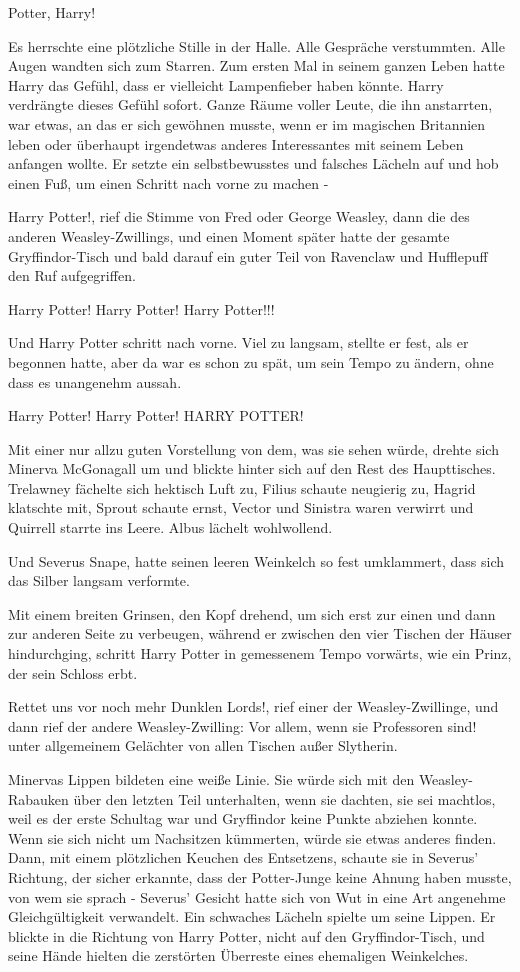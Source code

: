 \glqq Potter, Harry!\grqq{}

Es herrschte eine plötzliche Stille in der Halle. Alle Gespräche verstummten.
Alle Augen wandten sich zum Starren. Zum ersten Mal in seinem ganzen Leben hatte
Harry das Gefühl, dass er vielleicht Lampenfieber haben könnte. Harry verdrängte
dieses Gefühl sofort. Ganze Räume voller Leute, die ihn anstarrten, war etwas,
an das er sich gewöhnen musste, wenn er im magischen Britannien leben oder
überhaupt irgendetwas anderes Interessantes mit seinem Leben anfangen wollte. Er
setzte ein selbstbewusstes und falsches Lächeln auf und hob einen Fuß, um einen
Schritt nach vorne zu machen -

\glqq Harry Potter!\grqq{}, rief die Stimme von Fred oder George Weasley, dann
die des anderen Weasley-Zwillings, und einen Moment später hatte der gesamte
Gryffindor-Tisch und bald darauf ein guter Teil von Ravenclaw und Hufflepuff den
Ruf aufgegriffen.

\glqq Harry Potter! Harry Potter! Harry Potter!!!\grqq{}

Und Harry Potter schritt nach vorne. Viel zu langsam, stellte er fest, als er
begonnen hatte, aber da war es schon zu spät, um sein Tempo zu ändern, ohne dass
es unangenehm aussah.

\glqq Harry Potter! Harry Potter! HARRY POTTER!\grqq{}

Mit einer nur allzu guten Vorstellung von dem, was sie sehen würde, drehte sich
Minerva McGonagall um und blickte hinter sich auf den Rest des Haupttisches.
Trelawney fächelte sich hektisch Luft zu, Filius schaute neugierig zu, Hagrid
klatschte mit, Sprout schaute ernst, Vector und Sinistra waren verwirrt und
Quirrell starrte ins Leere. Albus lächelt wohlwollend.

Und Severus Snape, hatte seinen leeren Weinkelch so fest umklammert, dass sich
das Silber langsam verformte.

Mit einem breiten Grinsen, den Kopf drehend, um sich erst zur einen und dann zur
anderen Seite zu verbeugen, während er zwischen den vier Tischen der Häuser
hindurchging, schritt Harry Potter in gemessenem Tempo vorwärts, wie ein Prinz,
der sein Schloss erbt.

\glqq Rettet uns vor noch mehr Dunklen Lords!\grqq{}, rief einer der
Weasley-Zwillinge, und dann rief der andere Weasley-Zwilling: \glqq Vor allem,
wenn sie Professoren sind!\grqq{} unter allgemeinem Gelächter von allen Tischen
außer Slytherin.

Minervas Lippen bildeten eine weiße Linie. Sie würde sich mit den
Weasley-Rabauken über den letzten Teil unterhalten, wenn sie dachten, sie sei
machtlos, weil es der erste Schultag war und Gryffindor keine Punkte abziehen
konnte. Wenn sie sich nicht um Nachsitzen kümmerten, würde sie etwas anderes
finden. Dann, mit einem plötzlichen Keuchen des Entsetzens, schaute sie in
Severus' Richtung, der sicher erkannte, dass der Potter-Junge keine Ahnung haben
musste, von wem sie sprach - Severus' Gesicht hatte sich von Wut in eine Art
angenehme Gleichgültigkeit verwandelt. Ein schwaches Lächeln spielte um seine
Lippen. Er blickte in die Richtung von Harry Potter, nicht auf den
Gryffindor-Tisch, und seine Hände hielten die zerstörten Überreste eines
ehemaligen Weinkelches.

